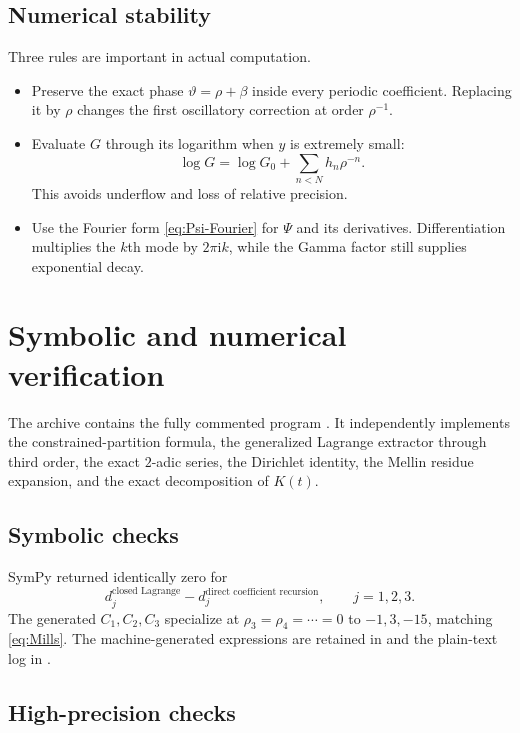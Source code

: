 \documentclass[11pt,oneside]{article}
\numberwithin{equation}{section}
\theoremstyle{definition}
\theoremstyle{remark}
\newcommand{\ii}{\mathrm i}
\newcommand{\phase}{\vartheta}
\begin{document}
\subsection{Numerical stability}

Three rules are important in actual computation.

\begin{itemize}
\item Preserve the exact phase $\phase=\rho+\beta$ inside every periodic
coefficient.  Replacing it by $\rho$ changes the first oscillatory correction
at order $\rho^{-1}$.
\item Evaluate $G$ through its logarithm when $y$ is extremely small:
\[
 \log G=\log G_0+\sum_{n<N}h_n\rho^{-n}.
\]
This avoids underflow and loss of relative precision.
\item Use the Fourier form \eqref{eq:Psi-Fourier} for $\Psi$ and its
 derivatives.  Differentiation multiplies the $k$th mode by $2\pi\ii k$, while
 the Gamma factor still supplies exponential decay.
\end{itemize}

\section{Symbolic and numerical verification}
\label{sec:verification}

The archive contains the fully commented program
.  It independently implements the
constrained-partition formula, the generalized Lagrange extractor through
third order, the exact $2$-adic series, the Dirichlet identity, the Mellin
residue expansion, and the exact decomposition of $K(t)$.

\subsection{Symbolic checks}

SymPy returned identically zero for
\begin{equation}
 d_j^{\text{closed Lagrange}}-d_j^{\text{direct coefficient recursion}},
 \qquad j=1,2,3.
 \label{eq:symbolic-zero}
\end{equation}
The generated $C_1,C_2,C_3$ specialize at
$\rho_3=\rho_4=\cdots=0$ to $-1,3,-15$, matching
\eqref{eq:Mills}.  The machine-generated expressions are retained in
 and the plain-text log in
.

\subsection{High-precision checks}
\end{document}
